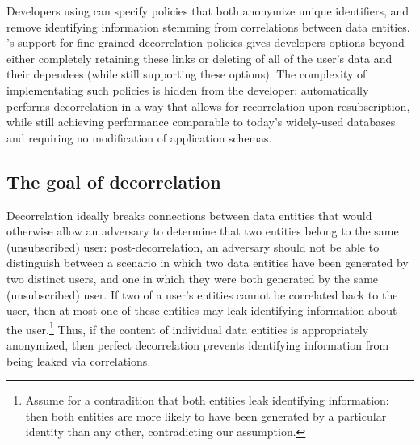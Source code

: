 Developers using \sys{} can specify policies that both anonymize unique identifiers, and remove
identifying information stemming from correlations between data entities. \sys{}'s support for
fine-grained decorrelation policies gives developers options beyond either completely retaining
these links or deleting of all of the user's data and their dependees (while still supporting
these options). The complexity of implementating such policies is hidden from the developer:
\sys{} automatically performs decorrelation in a way that allows for recorrelation upon
resubscription, while still achieving performance comparable to today’s widely-used databases and
requiring no modification of application schemas. 

\subsection{The goal of decorrelation}
Decorrelation ideally breaks connections between data entities that would otherwise allow
an adversary to determine that two entities belong to the same (unsubscribed) user:
post-decorrelation, an adversary should not be able to distinguish between a scenario in which two data entities
have been generated by two distinct users, and one in which they were both generated by the same
(unsubscribed) user.  If two of a user's entities cannot be correlated back to the user, then at
most one of these entities may leak identifying information about the user.\footnote{Assume for a
contradition that both entities leak identifying information: then both entities are more likely to
have been generated by a particular identity than any other, contradicting our assumption.}  Thus,
if the content of individual data entities is appropriately anonymized, then perfect decorrelation prevents
identifying information from being leaked via correlations.


